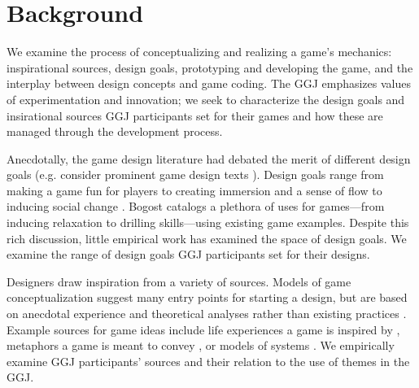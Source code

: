 \documentclass{sig-alternate}
\begin{document}



\section{Background}
We examine the process of conceptualizing and realizing a game's mechanics: inspirational sources, design goals, prototyping and developing the game, and the interplay between design concepts and game coding.
The GGJ emphasizes values of experimentation and innovation; we seek to characterize the design goals and insirational sources GGJ participants set for their games and how these are managed through the development process.

Anecdotally, the game design literature had debated the merit of different design goals (e.g. consider prominent game design texts \cite{fullerton2008:playcentric,salen2003:rulesplay,salen2006:reader,schell2008:gamedesign}). Design goals range from making a game fun for players \cite{koster2005:theory-fun} to creating immersion and a sense of flow \cite{salen2003:rulesplay} to inducing social change \cite{mcgonigal2011:realitybroken}. Bogost \cite{bogost2011:howto} catalogs a plethora of uses for games---from inducing relaxation to drilling skills---using existing game examples. Despite this rich discussion, little empirical work has examined the space of design goals. We examine the range of design goals GGJ participants set for their designs.

Designers draw inspiration from a variety of sources. Models of game conceptualization suggest many entry points for starting a design, but are based on anecdotal experience and theoretical analyses rather than existing practices \cite{hunicke2004:mda}. Example sources for game ideas include life experiences a game is inspired by \cite{anthropy2012:zinesters,treanor2010:kaboom}, metaphors a game is meant to convey \cite{rusch2008:game-metaphor}, or models of systems \cite{crawford1984:gamedesign}. We empirically examine GGJ participants' sources and their relation to the use of themes in the GGJ.
\end{document}
